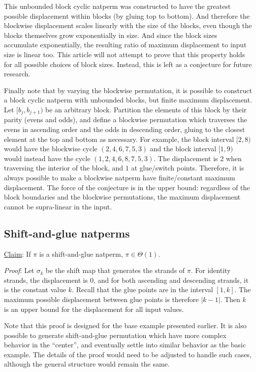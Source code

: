 \documentclass[12pt,reqno]{article}
\begin{document}
This unbounded block cyclic natperm was constructed to have the greatest possible displacement within blocks (by gluing top to bottom). And therefore the blockwise displacement scales linearly with the size of the blocks, even though the blocks themselves grow exponentially in size. And since the block sizes accumulate exponentially, the resulting ratio of maximum displacement to input size is linear too. This article will not attempt to prove that this property holds for all possible choices of block sizes. Instead, this is left as a conjecture for future research.

Finally note that by varying the blockwise permutation, it is possible to construct a block cyclic natperm with unbounded blocks, but finite maximum displacement. Let $[b_j, b_{j+1})$ be an arbitrary block. Partition the elements of this block by their parity (evens and odds), and define a blockwise permutation which traverses the evens in ascending order and the odds in descending order, gluing to the closest element at the top and bottom as necessary. For example, the block interval $[2, 8)$ would have the blockwise cycle $(2, 4, 6, 7, 5, 3)$ and the block interval $[1, 9)$ would instead have the cycle $(1, 2, 4, 6, 8, 7, 5, 3)$. The displacement is $2$ when traversing the interior of the block, and $1$ at glue/switch points. Therefore, it is always possible to make a blockwise natperm have finite/constant maximum displacement. The force of the conjecture is in the upper bound: regardless of the block boundaries and the blockwise permutations, the maximum displacement cannot be supra-linear in the input.

\subsection{Shift-and-glue natperms}

\underline{Claim}: If $\pi$ is a shift-and-glue natperm, $\pi \in \Theta(1)$.

\textit{Proof}: Let $\sigma_k$ be the shift map that generates the strands of $\pi$. For identity strands, the displacement is $0$, and for both ascending and descending strands, it is the constant value $k$. Recall that the glue points are in the interval $[1, k]$. The maximum possible displacement between glue points is therefore $|k - 1|$. Then $k$ is an upper bound for the displacement for all input values.

Note that this proof is designed for the base example presented earlier. It is also possible to generate shift-and-glue permutation which have more complex behavior in the ``center'', and eventually settle into similar behavior as the basic example. The details of the proof would need to be adjusted to handle such cases, although the general structure would remain the same. 
\end{document}
